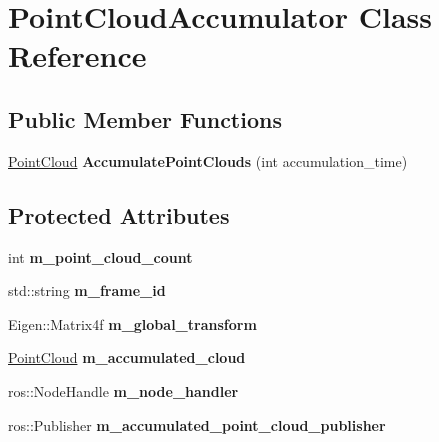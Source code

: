 \hypertarget{class_point_cloud_accumulator}{\section{\-Point\-Cloud\-Accumulator \-Class \-Reference}
\label{class_point_cloud_accumulator}
}
\subsection*{\-Public \-Member \-Functions}
\begin{DoxyCompactItemize}
\item 
\hypertarget{class_point_cloud_accumulator_a24d93cde9ce3cce292779934f2b97ede}{\hyperlink{_helper_functions_8hpp_abb956d1047f4dd2c956fe3cb0dd0004d}{\-Point\-Cloud} {\bfseries \-Accumulate\-Point\-Clouds} (int accumulation\-\_\-time)}\label{class_point_cloud_accumulator_a24d93cde9ce3cce292779934f2b97ede}

\end{DoxyCompactItemize}
\subsection*{\-Protected \-Attributes}
\begin{DoxyCompactItemize}
\item 
\hypertarget{class_point_cloud_accumulator_a6ebb0ca53506f1ae2d0f6e411e2dff66}{int {\bfseries m\-\_\-point\-\_\-cloud\-\_\-count}}\label{class_point_cloud_accumulator_a6ebb0ca53506f1ae2d0f6e411e2dff66}

\item 
\hypertarget{class_point_cloud_accumulator_af8ef35b00c6d547b8d3fa89ad8a8b49a}{std\-::string {\bfseries m\-\_\-frame\-\_\-id}}\label{class_point_cloud_accumulator_af8ef35b00c6d547b8d3fa89ad8a8b49a}

\item 
\hypertarget{class_point_cloud_accumulator_a7ea0dd4449475e6939cefbdb0fd260c5}{\-Eigen\-::\-Matrix4f {\bfseries m\-\_\-global\-\_\-transform}}\label{class_point_cloud_accumulator_a7ea0dd4449475e6939cefbdb0fd260c5}

\item 
\hypertarget{class_point_cloud_accumulator_a0db3c1a8e6de37bcb25c260626d63ff0}{\hyperlink{_helper_functions_8hpp_abb956d1047f4dd2c956fe3cb0dd0004d}{\-Point\-Cloud} {\bfseries m\-\_\-accumulated\-\_\-cloud}}\label{class_point_cloud_accumulator_a0db3c1a8e6de37bcb25c260626d63ff0}

\item 
\hypertarget{class_point_cloud_accumulator_ac9070e4cb82ddf04bb50cc2492e597ae}{ros\-::\-Node\-Handle {\bfseries m\-\_\-node\-\_\-handler}}\label{class_point_cloud_accumulator_ac9070e4cb82ddf04bb50cc2492e597ae}

\item 
\hypertarget{class_point_cloud_accumulator_a117cbef73e39daeda50c32212a3cc603}{ros\-::\-Publisher {\bfseries m\-\_\-accumulated\-\_\-point\-\_\-cloud\-\_\-publisher}}\label{class_point_cloud_accumulator_a117cbef73e39daeda50c32212a3cc603}

\end{DoxyCompactItemize}


